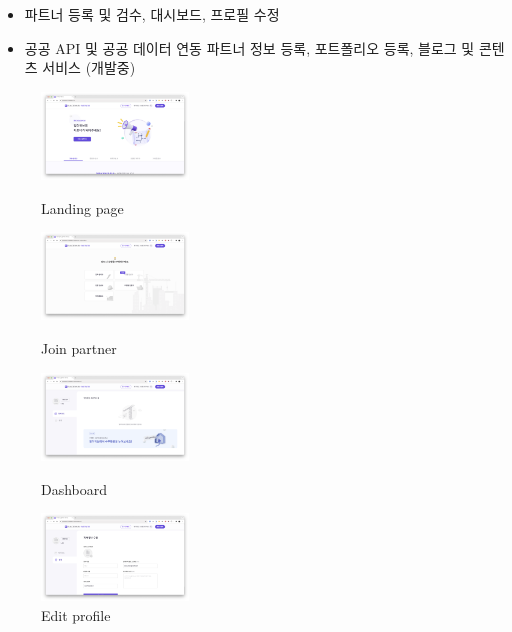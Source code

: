 \begin{itemize}[label=]
\begin{itemize}[label=]
\begin{itemize}
			            \item 파트너 등록 및 검수, 대시보드, 프로필 수정
			            \item 공공 API 및 공공 데이터 연동 파트너 정보 등록, 포트폴리오 등록, 블로그 및 콘텐츠 서비스 (개발중)
		            \end{itemize}
		            \begin{figure}[!ht]
			            \begin{fullwidth}
				            \parbox{0.35\textwidth}{
					            \centering
					            \includegraphics[width=0.35\textwidth]{images/builderhub-partners-main.png}
					            \caption*{Landing page}
				            }\qquad
				            \parbox{0.35\textwidth}{
					            \centering
					            \includegraphics[width=0.35\textwidth]{images/builderhub-partners-join.png}
					            \caption*{Join partner}
				            }\qquad
				            \parbox{0.35\textwidth}{
					            \centering
					            \includegraphics[width=0.35\textwidth]{images/builderhub-partners-dashboard.png}
					            \caption*{Dashboard}
				            }\qquad
				            \parbox{0.35\textwidth}{
					            \centering
					            \includegraphics[width=0.35\textwidth]{images/builderhub-partners-edit.png}
					            \caption*{Edit profile}
}
\end{fullwidth}
\end{figure}
\end{itemize}
\end{itemize}
